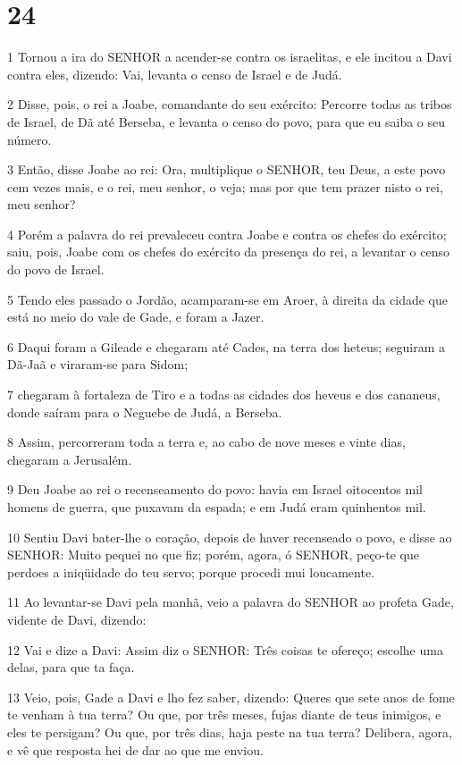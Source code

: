 \chapter{24}

\par 1 Tornou a ira do SENHOR a acender-se contra os israelitas, e ele incitou a Davi contra eles, dizendo: Vai, levanta o censo de Israel e de Judá.
\par 2 Disse, pois, o rei a Joabe, comandante do seu exército: Percorre todas as tribos de Israel, de Dã até Berseba, e levanta o censo do povo, para que eu saiba o seu número.
\par 3 Então, disse Joabe ao rei: Ora, multiplique o SENHOR, teu Deus, a este povo cem vezes mais, e o rei, meu senhor, o veja; mas por que tem prazer nisto o rei, meu senhor?
\par 4 Porém a palavra do rei prevaleceu contra Joabe e contra os chefes do exército; saiu, pois, Joabe com os chefes do exército da presença do rei, a levantar o censo do povo de Israel.
\par 5 Tendo eles passado o Jordão, acamparam-se em Aroer, à direita da cidade que está no meio do vale de Gade, e foram a Jazer.
\par 6 Daqui foram a Gileade e chegaram até Cades, na terra dos heteus; seguiram a Dã-Jaã e viraram-se para Sidom;
\par 7 chegaram à fortaleza de Tiro e a todas as cidades dos heveus e dos cananeus, donde saíram para o Neguebe de Judá, a Berseba.
\par 8 Assim, percorreram toda a terra e, ao cabo de nove meses e vinte dias, chegaram a Jerusalém.
\par 9 Deu Joabe ao rei o recenseamento do povo: havia em Israel oitocentos mil homens de guerra, que puxavam da espada; e em Judá eram quinhentos mil.
\par 10 Sentiu Davi bater-lhe o coração, depois de haver recenseado o povo, e disse ao SENHOR: Muito pequei no que fiz; porém, agora, ó SENHOR, peço-te que perdoes a iniqüidade do teu servo; porque procedi mui loucamente.
\par 11 Ao levantar-se Davi pela manhã, veio a palavra do SENHOR ao profeta Gade, vidente de Davi, dizendo:
\par 12 Vai e dize a Davi: Assim diz o SENHOR: Três coisas te ofereço; escolhe uma delas, para que ta faça.
\par 13 Veio, pois, Gade a Davi e lho fez saber, dizendo: Queres que sete anos de fome te venham à tua terra? Ou que, por três meses, fujas diante de teus inimigos, e eles te persigam? Ou que, por três dias, haja peste na tua terra? Delibera, agora, e vê que resposta hei de dar ao que me enviou.
